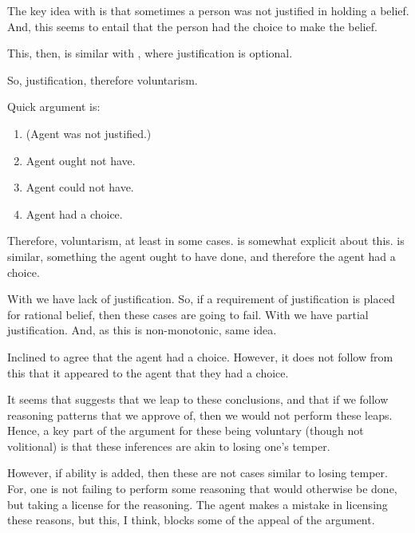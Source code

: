\documentclass[10pt]{article}
\begin{document}
\begin{note}[Justification]
  The key idea with \citeauthor{Ginet:2001aa} is that sometimes a person was not justified in holding a belief.
  And, this seems to entail that the person had the choice to make the belief.

  This, then, is similar with \citeauthor{Weatherson:2008uq}, where justification is optional.

  So, justification, therefore voluntarism.

  Quick argument is:

  \begin{enumerate}
  \item (Agent was not justified.)
  \item Agent ought not have.
  \item Agent could not have.
  \item Agent had a choice.
  \end{enumerate}
  Therefore, voluntarism, at least in some cases.
  \citeauthor{Ginet:2001aa} is somewhat explicit about this.
  \citeauthor{Weatherson:2008uq} is similar, something the agent ought to have done, and therefore the agent had a choice.

  With \citeauthor{Ginet:2001aa} we have lack of justification.
  So, if a requirement of justification is placed for rational belief, then these cases are going to fail.
  With \citeauthor{Weatherson:2008uq} we have partial justification.
  And, as this is non-monotonic, same idea.

  Inclined to agree that the agent had a choice.
  However, it does not follow from this that it appeared to the agent that they had a choice.
\end{note}

\begin{note}[Weatherson]
  It seems that \textcite[10]{Weatherson:2008uq} suggests that we leap to these conclusions, and that if we follow reasoning patterns that we approve of, then we would not perform these leaps.
  Hence, a key part of the argument for these being voluntary (though not volitional) is that these inferences are akin to losing one's temper.

  However, if ability is added, then these are not cases similar to losing temper.
  For, one is not failing to perform some reasoning that would otherwise be done, but taking a license for the reasoning.
  The agent makes a mistake in licensing these reasons, but this, I think, blocks some of the appeal of the argument.
\end{note}
\end{document}

